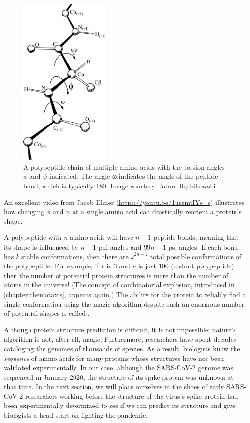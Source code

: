 \begin{figure}[h]
	\centering
	\mySfFamily
	\includegraphics[width = 0.4\textwidth]{../images/torsion_angles.png}
	\caption{A polypeptide chain of multiple amino acids with the torsion angles $\phi$ and $\psi$ indicated. The angle ω indicates the angle of the peptide bond, which is typically 180\textdegree. Image courtesy: Adam Rędzikowski.}
	\label{fig:torsion_angles}
\end{figure}

An excellent video from Jacob Elmer (\url{https://youtu.be/1usemtIYe_s}) illustrates how changing $\phi$ and $\psi$ at a single amino acid can drastically reorient a protein's shape.

A polypeptide with \textit{n} amino acids will have $n - 1$ peptide bonds, meaning that its shape is influenced by $n - 1$ phi angles and $99 n - 1$ psi angles. If each bond has \textit{k} stable conformations, then there are $k^{2n-2}$ total possible conformations of the polypeptide. For example, if \textit{k} is 3 and \textit{n} is just 100 (a short polypeptide), then the number of potential protein structures is more than the number of atoms in the universe! (The concept of combinatorial explosion, introduced in \autoref{chapter:chemotaxis}, appears again.) The ability for the protein to reliably find a single conformation using the magic algorithm despite such an enormous number of potential shapes is called .

Although protein structure prediction is difficult, it is not impossible; nature's algorithm is not, after all, magic. Furthermore, researchers have spent decades cataloging the genomes of thousands of species. As a result, biologists know the \textit{sequence} of amino acids for many proteins whose structures have not been validated experimentally. In our case, although the SARS-CoV-2 genome was sequenced in January 2020, the structure of its spike protein was unknown at that time.  In the next section, we will place ourselves in the shoes of early SARS-CoV-2 researchers working before the structure of the virus's spike protein had been experimentally determined to see if we can predict its structure and give biologists a head start on fighting the pandemic.


